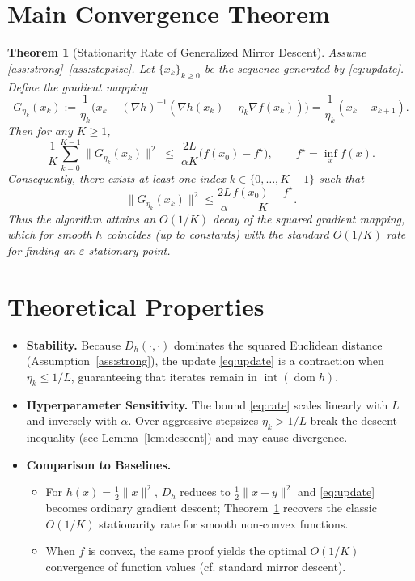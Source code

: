 \documentclass{article}
\newtheorem{theorem}{Theorem}
\newcommand{\Breg}[2]{D_h(#1,#2)}
\newcommand{\grad}[1]{\nabla #1}
\begin{document}
\section*{Main Convergence Theorem}
\begin{theorem}[Stationarity Rate of Generalized Mirror Descent]\label{thm:main}
Assume \ref{ass:strong}–\ref{ass:stepsize}. Let $\{x_k\}_{k\ge0}$ be the sequence generated by \eqref{eq:update}. Define the \emph{gradient mapping}
\[
G_{\eta_k}(x_k):=\frac{1}{\eta_k}\bigl(x_k-(\grad{h})^{-1}(\grad{h}(x_k)-\eta_k\grad{f}(x_k))\bigr)
               =\frac{1}{\eta_k}(x_k-x_{k+1}).
\]
Then for any $K\ge1$,
\begin{equation}
\frac{1}{K}\sum_{k=0}^{K-1}\|G_{\eta_k}(x_k)\|^{2}
\;\le\;
\frac{2L}{\alpha K}\bigl(f(x_{0})-f^{\star}\bigr),
\qquad
f^{\star}= \inf_{x}f(x).
\label{eq:rate}
\end{equation}
Consequently, there exists at least one index $k\in\{0,\dots,K-1\}$ such that
\[
\|G_{\eta_k}(x_k)\|^{2}\le \frac{2L}{\alpha}\frac{f(x_{0})-f^{\star}}{K}.
\]
Thus the algorithm attains an $O(1/K)$ decay of the squared gradient mapping, which for smooth $h$ coincides (up to constants) with the standard $O(1/K)$ rate for finding an $\varepsilon$‑stationary point.
\end{theorem}

\section*{Theoretical Properties}
\begin{itemize}
\item \textbf{Stability.} Because $\Breg{\cdot}{\cdot}$ dominates the squared Euclidean distance (Assumption~\ref{ass:strong}), the update \eqref{eq:update} is a contraction when $\eta_k\le 1/L$, guaranteeing that iterates remain in $\operatorname{int}(\operatorname{dom}h)$.
\item \textbf{Hyperparameter Sensitivity.} The bound \eqref{eq:rate} scales linearly with $L$ and inversely with $\alpha$. Over‑aggressive stepsizes $\eta_k>1/L$ break the descent inequality (see Lemma~\ref{lem:descent}) and may cause divergence.
\item \textbf{Comparison to Baselines.}
    \begin{itemize}
        \item For $h(x)=\tfrac12\|x\|^{2}$, $D_h$ reduces to $\tfrac12\|x-y\|^{2}$ and \eqref{eq:update} becomes ordinary gradient descent; Theorem~\ref{thm:main} recovers the classic $O(1/K)$ stationarity rate for smooth non‑convex functions.
        \item When $f$ is convex, the same proof yields the optimal $O(1/K)$ convergence of function values (cf. standard mirror descent).
    \end{itemize}
\end{itemize}
\end{document}
